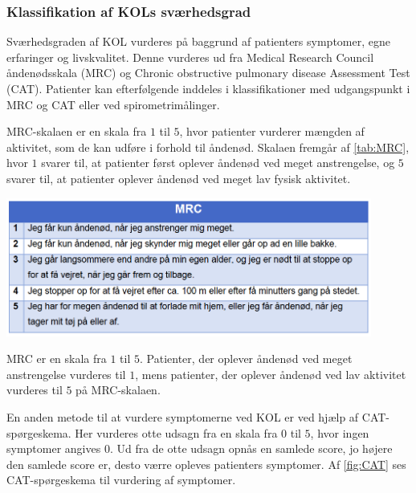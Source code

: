 \subsubsection{Klassifikation af KOLs sværhedsgrad}
Sværhedsgraden af KOL vurderes på baggrund af patienters symptomer, egne erfaringer og livskvalitet. Denne vurderes ud fra Medical Research Council åndenødsskala (MRC) og Chronic obstructive pulmonary disease Assessment Test (CAT). Patienter kan efterfølgende inddeles i klassifikationer med udgangspunkt i MRC og CAT eller ved spirometrimålinger.\cite{Basisbogen2016}

 
MRC-skalaen er en skala fra $1$ til $5$, hvor patienter vurderer mængden af aktivitet, som de kan udføre i forhold til åndenød. Skalaen fremgår af \autoref{tab:MRC}, hvor $1$ svarer til, at patienter først oplever åndenød ved meget anstrengelse, og $5$ svarer til, at patienter oplever åndenød ved meget lav fysisk aktivitet.\cite{Basisbogen2016}

\begin{table} [H]
\centering
\includegraphics[width=0.9\textwidth]{figures/MRC}
\caption{MRC er en skala fra $1$ til $5$. Patienter, der oplever åndenød ved meget anstrengelse vurderes til $1$, mens patienter, der oplever åndenød ved lav aktivitet vurderes til $5$ på MRC-skalaen.}
\label{tab:MRC}
\end{table} 

\noindent
En anden metode til at vurdere symptomerne ved KOL er ved hjælp af CAT-spørgeskema. Her vurderes otte udsagn fra en skala fra $0$ til $5$, hvor ingen symptomer angives $0$. Ud fra de otte udsagn opnås en samlede score, jo højere den samlede score er, desto værre opleves patienters symptomer. Af \autoref{fig:CAT} ses CAT-spørgeskema til vurdering af symptomer.\cite{dsam2016,Basisbogen2016}

